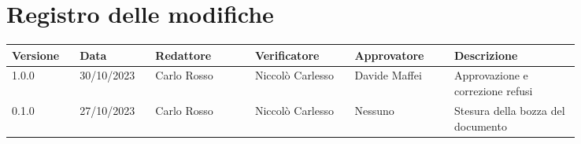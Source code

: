 
\section*{Registro delle modifiche}
{
\renewcommand{\arraystretch}{1.5}
\scriptsize
\begin{tabular}{p{0.10\linewidth}p{0.10\linewidth}p{0.15\linewidth}p{0.15\linewidth}p{0.15\linewidth}p{0.19\linewidth}}
    \textbf{Versione}   & \textbf{Data} & \textbf{Redattore}     & \textbf{Verificatore} & \textbf{Approvatore}  & \textbf{Descrizione}  \\
    \hline
	1.0.0 & 30/10/2023 & Carlo Rosso & Niccolò Carlesso & Davide Maffei & Approvazione e correzione refusi
    \\
    \hline
	0.1.0 & 27/10/2023 & Carlo Rosso & Niccolò Carlesso & Nessuno & Stesura
	della bozza del documento \\
    \hline
\end{tabular}
}

